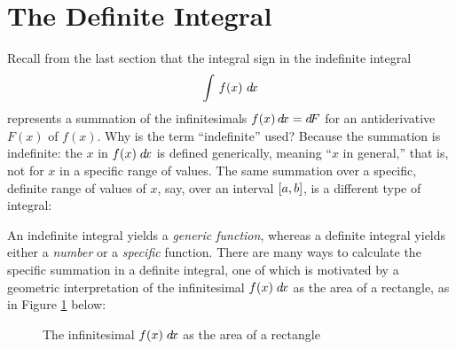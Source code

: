 \section{The Definite Integral}\label{sec:definite-integral}
Recall from the last section that the integral sign in the indefinite integral
\[
\int\,f(x)~d\!x
\]
represents a summation of the infinitesimals $f(x)\,d\!x = d\!F$ for an
antiderivative $F(x)$ of $f(x)$. Why is the term ``indefinite'' used? Because
the summation is indefinite: the $x$ in $f(x)\;d\!x$ is defined generically,
meaning ``$x$ in general,'' that is, not for $x$ in a specific range of values.
The same summation over a specific, definite range of values of $x$, say, over
an interval $\lbrack a,b \rbrack$, is a different type of
integral:


An indefinite integral yields a \emph{generic function}, whereas a definite
integral yields either a \emph{number} or a \emph{specific} function. There are
many ways to calculate the specific summation in a definite integral, one of
which is motivated by a geometric interpretation of the infinitesimal
$f(x)\;d\!x$ as the area of a rectangle, as in Figure \ref{fig:defint} below:

\begin{figure}[ht]
 \begin{center}
  \vspace{-5mm}
 \end{center}
 \caption[]{\quad The infinitesimal $f(x)\;d\!x$ as the area of a rectangle}
 \label{fig:defint}
\end{figure}

